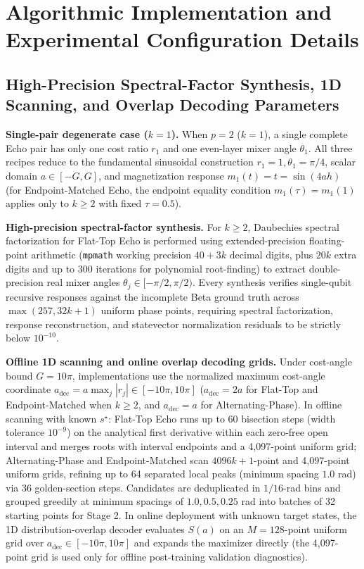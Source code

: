 \documentclass{article}
\theoremstyle{plain}
\theoremstyle{definition}
\begin{document}
\section{Algorithmic Implementation and Experimental Configuration Details}\label{app:B}

\subsection{High-Precision Spectral-Factor Synthesis, 1D Scanning, and Overlap Decoding Parameters}\label{subsec:b_1}

\textbf{Single-pair degenerate case ($k=1$).} When $p=2$ ($k=1$), a single complete Echo pair has only one cost ratio $r_1$ and one even-layer mixer angle $\theta_1$. All three recipes reduce to the fundamental sinusoidal construction $r_1=1, \theta_1=\pi/4$, scalar domain $a\in[-G,G]$, and magnetization response $m_1(t)=t=\sin(4ah)$ (for Endpoint-Matched Echo, the endpoint equality condition $m_1(\tau)=m_1(1)$ applies only to $k\ge 2$ with fixed $\tau=0.5$).

\textbf{High-precision spectral-factor synthesis.} For $k\ge 2$, Daubechies spectral factorization for Flat-Top Echo is performed using extended-precision floating-point arithmetic (\texttt{mpmath} working precision $40+3k$ decimal digits, plus $20k$ extra digits and up to 300 iterations for polynomial root-finding) to extract double-precision real mixer angles $\theta_j\in[-\pi/2,\pi/2)$. Every synthesis verifies single-qubit recursive responses against the incomplete Beta ground truth across $\max(257, 32k+1)$ uniform phase points, requiring spectral factorization, response reconstruction, and statevector normalization residuals to be strictly below $10^{-10}$.

\textbf{Offline 1D scanning and online overlap decoding grids.} Under cost-angle bound $G=10\pi$, implementations use the normalized maximum cost-angle coordinate $a_{\mathrm{dec}}=a\max_j|r_j|\in[-10\pi,10\pi]$ ($a_{\mathrm{dec}}=2a$ for Flat-Top and Endpoint-Matched when $k\ge 2$, and $a_{\mathrm{dec}}=a$ for Alternating-Phase). In offline scanning with known $s^\star$: Flat-Top Echo runs up to 60 bisection steps (width tolerance $10^{-9}$) on the analytical first derivative within each zero-free open interval and merges roots with interval endpoints and a 4,097-point uniform grid; Alternating-Phase and Endpoint-Matched scan $4096k+1$-point and 4,097-point uniform grids, refining up to 64 separated local peaks (minimum spacing $1.0$ rad) via 36 golden-section steps. Candidates are deduplicated in $1/16$-rad bins and grouped greedily at minimum spacings of $1.0, 0.5, 0.25$ rad into batches of 32 starting points for Stage 2. In online deployment with unknown target states, the 1D distribution-overlap decoder evaluates $S(a)$ on an $M=128$-point uniform grid over $a_{\mathrm{dec}}\in[-10\pi,10\pi]$ and expands the maximizer directly (the 4,097-point grid is used only for offline post-training validation diagnostics).
\end{document}
